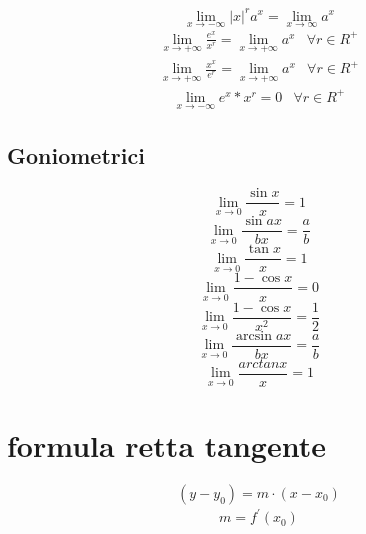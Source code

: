 \documentclass{article}
\newcommand{\abs}[1]{\lvert#1\rvert}
\begin{document}
\begin{multicols}{2}
\begin{equation}
\end{equation}
\begin{equation}
	\lim_{x\to-\infty}\abs{x}^ra^x=\lim_{x\to\infty}a^x
\end{equation}
\begin{equation}
	\begin{matrix}
		\lim_{x\to+\infty}\frac{e^x}{x^r}=\lim_{x\to+\infty}a^x&\forall r \in R^+
	\end{matrix}
\end{equation}
\begin{equation}
	\begin{matrix}
		\lim_{x\to+\infty}\frac{x^x}{e^r}=\lim_{x\to+\infty}a^x&\forall r \in R^+
	\end{matrix}
\end{equation}
\begin{equation}
	\begin{matrix}
		\lim_{x\to-\infty}e^x*x^r=0&\forall r \in R^+
	\end{matrix}
\end{equation}
\end{multicols}
\subsection{Goniometrici}
\begin{multicols}{2}
\begin{equation}
	\lim_{x\to0}\frac{\sin x}{x}=1
\end{equation}
\begin{equation}
	\lim_{x\to0}\frac{\sin ax}{bx}=\frac{a}{b}
\end{equation}
\begin{equation}
	\lim_{x\to0}\frac{\tan x}{x}=1
\end{equation}
\begin{equation}
	\lim_{x\to0}\frac{1-\cos x}{x}=0
\end{equation}
\begin{equation}
	\lim_{x\to0}\frac{1-\cos x}{x^2}=\frac{1}{2}
\end{equation}
\begin{equation}
	\lim_{x\to0}\frac{\arcsin ax}{bx}=\frac{a}{b}
\end{equation}
\begin{equation}
	\lim_{x\to0}\frac{arctan x}{x}=1
\end{equation}
\end{multicols}
\section{formula retta tangente}
\begin{equation}
(y - y_0) = m·( x - x_0)
\end{equation}
\begin{eqnarray}
	m=f^\prime(x_0)
\end{eqnarray}
\end{document}
